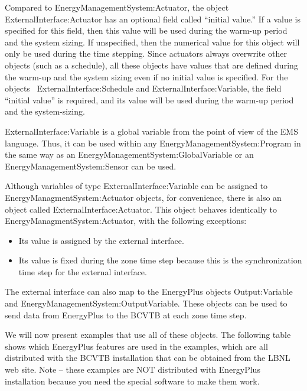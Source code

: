 Compared to EnergyManagementSystem:Actuator, the object ExternalInterface:Actuator has an optional field called ``initial value.'' If a value is specified for this field, then this value will be used during the warm-up period and the system sizing. If unspecified, then the numerical value for this object will only be used during the time stepping. Since actuators always overwrite other objects (such as a schedule), all these objects have values that are defined during the warm-up and the system sizing even if no initial value is specified. For the objects~ ExternalInterface:Schedule and ExternalInterface:Variable, the field ``initial value'' is required, and its value will be used during the warm-up period and the system-sizing.

ExternalInterface:Variable is a global variable from the point of view of the EMS language. Thus, it can be used within any EnergyManagementSystem:Program in the same way as an EnergyManagementSystem:GlobalVariable or an EnergyManagementSystem:Sensor can be used.

Although variables of type ExternalInterface:Variable can be assigned to EnergyManagmentSystem:Actuator objects, for convenience, there is also an object called ExternalInterface:Actuator. This object behaves identically to EnergyManagmentSystem:Actuator, with the following exceptions:

\begin{itemize}
\item
  Its value is assigned by the external interface.
\item
  Its value is fixed during the zone time step because this is the synchronization time step for the external interface.
\end{itemize}

The external interface can also map to the EnergyPlus objects Output:Variable and EnergyManagementSystem:OutputVariable. These objects can be used to send data from EnergyPlus to the BCVTB at each zone time step.

We will now present examples that use all of these objects. The following table shows which EnergyPlus features are used in the examples, which are all distributed with the BCVTB installation that can be obtained from the LBNL web site. Note -- these examples are NOT distributed with EnergyPlus installation because you need the special software to make them work.

